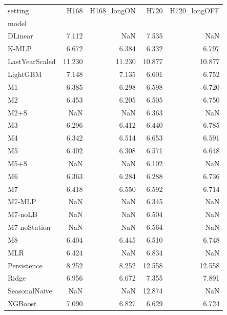 \begin{tabular}{lrrrr}
\toprule
setting & H168 & H168_longON & H720 & H720_longOFF \\
model &  &  &  &  \\
\midrule
DLinear & 7.112 & NaN & 7.535 & NaN \\
K-MLP & 6.672 & 6.384 & 6.332 & 6.797 \\
LastYearScaled & 11.230 & 11.230 & 10.877 & 10.877 \\
LightGBM & 7.148 & 7.135 & 6.601 & 6.752 \\
M1 & 6.385 & 6.298 & 6.598 & 6.720 \\
M2 & 6.453 & 6.205 & 6.505 & 6.750 \\
M2+S & NaN & NaN & 6.363 & NaN \\
M3 & 6.296 & 6.412 & 6.440 & 6.785 \\
M4 & 6.342 & 6.514 & 6.653 & 6.591 \\
M5 & 6.402 & 6.308 & 6.571 & 6.648 \\
M5+S & NaN & NaN & 6.102 & NaN \\
M6 & 6.363 & 6.284 & 6.288 & 6.736 \\
M7 & 6.418 & 6.550 & 6.592 & 6.714 \\
M7-MLP & NaN & NaN & 6.345 & NaN \\
M7-noLB & NaN & NaN & 6.504 & NaN \\
M7-noStation & NaN & NaN & 6.564 & NaN \\
M8 & 6.404 & 6.445 & 6.510 & 6.748 \\
MLR & 6.424 & NaN & 6.834 & NaN \\
Persistence & 8.252 & 8.252 & 12.558 & 12.558 \\
Ridge & 6.956 & 6.672 & 7.355 & 7.891 \\
SeasonalNaive & NaN & NaN & 12.874 & NaN \\
XGBoost & 7.090 & 6.827 & 6.629 & 6.724 \\
\bottomrule
\end{tabular}
